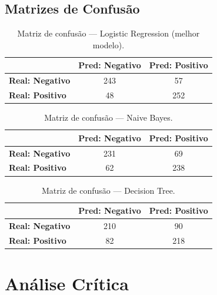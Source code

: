 \documentclass[12pt,a4paper]{article}
\begin{document}
\subsection{Matrizes de Confusão}

\begin{table}[H]
\centering
\caption{Matriz de confusão --- Logistic Regression (melhor modelo).}
\label{tab:cm-lr}
\begin{tabular}{lcc}
\toprule
 & \textbf{Pred: Negativo} & \textbf{Pred: Positivo} \\
\midrule
\textbf{Real: Negativo} & 243 & 57 \\
\textbf{Real: Positivo} & 48 & 252 \\
\bottomrule
\end{tabular}
\end{table}

\begin{table}[H]
\centering
\caption{Matriz de confusão --- Naive Bayes.}
\label{tab:cm-nb}
\begin{tabular}{lcc}
\toprule
 & \textbf{Pred: Negativo} & \textbf{Pred: Positivo} \\
\midrule
\textbf{Real: Negativo} & 231 & 69 \\
\textbf{Real: Positivo} & 62 & 238 \\
\bottomrule
\end{tabular}
\end{table}

\begin{table}[H]
\centering
\caption{Matriz de confusão --- Decision Tree.}
\label{tab:cm-dt}
\begin{tabular}{lcc}
\toprule
 & \textbf{Pred: Negativo} & \textbf{Pred: Positivo} \\
\midrule
\textbf{Real: Negativo} & 210 & 90 \\
\textbf{Real: Positivo} & 82 & 218 \\
\bottomrule
\end{tabular}
\end{table}

\section{Análise Crítica}
\end{document}
